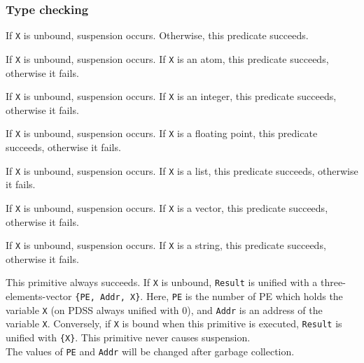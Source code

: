 \subsubsection{Type checking}
\begin{itemize}

If \verb|X| is unbound, suspension occurs. Otherwise, this predicate succeeds.

If \verb|X| is unbound, suspension occurs.
If \verb|X| is an atom, this predicate succeeds, otherwise it fails.

If \verb|X| is unbound, suspension occurs.
If \verb|X| is an integer, this predicate succeeds, otherwise it fails.

If \verb|X| is unbound, suspension occurs.
If \verb|X| is a floating point, this predicate succeeds, otherwise it fails.

If \verb|X| is unbound, suspension occurs.
If \verb|X| is a list, this predicate succeeds, otherwise it fails.

If \verb|X| is unbound, suspension occurs.
If \verb|X| is a vector, this predicate succeeds, otherwise it fails.

If \verb|X| is unbound, suspension occurs.
If \verb|X| is a string, this predicate succeeds, otherwise it fails.

This primitive always succeeds.
If \verb|X| is unbound, \verb|Result| is unified with a three-elements-vector
\verb|{PE, Addr, X}|. Here,
\verb|PE| is the number of PE which holds the variable \verb|X| 
(on PDSS always unified with 0),
and \verb|Addr| is an address of the variable \verb|X|.
Conversely, if \verb|X| is bound when this primitive is executed,
\verb|Result| is unified with \verb|{X}|.
This primitive never causes suspension.\\
\Caution The values of \verb|PE| and \verb|Addr| will be changed after
garbage collection.

\end{itemize}
